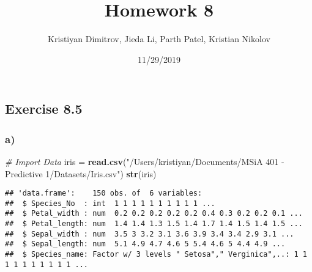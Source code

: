 \documentclass[]{article}
\title{Homework 8}
\author{Kristiyan Dimitrov, Jieda Li, Parth Patel, Kristian Nikolov}
\date{11/29/2019}
\newenvironment{Shaded}{\begin{snugshade}}{\end{snugshade}}
\newcommand{\CommentTok}[1]{\textcolor[rgb]{0.56,0.35,0.01}{\textit{#1}}}
\newcommand{\DataTypeTok}[1]{\textcolor[rgb]{0.13,0.29,0.53}{#1}}
\newcommand{\DecValTok}[1]{\textcolor[rgb]{0.00,0.00,0.81}{#1}}
\newcommand{\KeywordTok}[1]{\textcolor[rgb]{0.13,0.29,0.53}{\textbf{#1}}}
\newcommand{\NormalTok}[1]{#1}
\newcommand{\OperatorTok}[1]{\textcolor[rgb]{0.81,0.36,0.00}{\textbf{#1}}}
\newcommand{\StringTok}[1]{\textcolor[rgb]{0.31,0.60,0.02}{#1}}
\begin{document}
\maketitle

\hypertarget{exercise-8.5}{%
\subsection{Exercise 8.5}\label{exercise-8.5}}

\hypertarget{a}{%
\subsubsection{a)}\label{a}}

\begin{Shaded}
\begin{Highlighting}[]
\CommentTok{# Import Data}
\NormalTok{iris =}\StringTok{ }\KeywordTok{read.csv}\NormalTok{(}\StringTok{"/Users/kristiyan/Documents/MSiA 401 - Predictive 1/Datasets/Iris.csv"}\NormalTok{)}
\KeywordTok{str}\NormalTok{(iris)}
\end{Highlighting}
\end{Shaded}

\begin{verbatim}
## 'data.frame':    150 obs. of  6 variables:
##  $ Species_No  : int  1 1 1 1 1 1 1 1 1 1 ...
##  $ Petal_width : num  0.2 0.2 0.2 0.2 0.2 0.4 0.3 0.2 0.2 0.1 ...
##  $ Petal_length: num  1.4 1.4 1.3 1.5 1.4 1.7 1.4 1.5 1.4 1.5 ...
##  $ Sepal_width : num  3.5 3 3.2 3.1 3.6 3.9 3.4 3.4 2.9 3.1 ...
##  $ Sepal_length: num  5.1 4.9 4.7 4.6 5 5.4 4.6 5 4.4 4.9 ...
##  $ Species_name: Factor w/ 3 levels " Setosa"," Verginica",..: 1 1 1 1 1 1 1 1 1 1 ...
\end{verbatim}

\begin{Shaded}
\end{Shaded}
\end{document}
